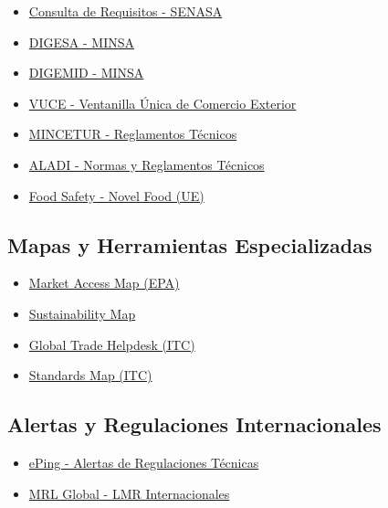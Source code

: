 \documentclass[
  jou,
  floatsintext,
  longtable,
  a4paper,
  nolmodern,
  notxfonts,
  notimes,
  colorlinks=true,linkcolor=blue,citecolor=blue,urlcolor=blue]{apa7}
\providecommand{\tightlist}{%
  \setlength{\itemsep}{0pt}\setlength{\parskip}{0pt}}
\begin{document}
\begin{itemize}
\tightlist
\item
  \href{https://servicios.senasa.gob.pe/consultaRequisitos/consultarRequisitos.action}{Consulta
  de Requisitos - SENASA}
\item
  \href{http://www.digesa.minsa.gob.pe/}{DIGESA - MINSA}
\item
  \href{https://www.digemid.minsa.gob.pe/webDigemid/}{DIGEMID - MINSA}
\item
  \href{https://www.vuce.gob.pe/Paginas/Inicio.aspx}{VUCE - Ventanilla
  Única de Comercio Exterior}
\item
  \href{https://www.mincetur.gob.pe/reglamentostecnicos/}{MINCETUR -
  Reglamentos Técnicos}
\item
  \href{https://www.aladi.org/sitioaladi/normas-y-reglamentos-tecnicos/}{ALADI
  - Normas y Reglamentos Técnicos}
\item
  \href{https://food.ec.europa.eu/food-safety/novel-food_en}{Food Safety
  - Novel Food (UE)}
\end{itemize}

\subsection{Mapas y Herramientas
Especializadas}\label{mapas-y-herramientas-especializadas}

\begin{itemize}
\tightlist
\item
  \href{https://m.macmap.org/es/learn/epa}{Market Access Map (EPA)}
\item
  \href{https://www.sustainabilitymap.org/home}{Sustainability Map}
\item
  \href{https://globaltradehelpdesk.org/es}{Global Trade Helpdesk (ITC)}
\item
  \href{https://www.standardsmap.org/es/home}{Standards Map (ITC)}
\end{itemize}

\subsection{Alertas y Regulaciones
Internacionales}\label{alertas-y-regulaciones-internacionales}

\begin{itemize}
\tightlist
\item
  \href{https://epingalert.org/}{ePing - Alertas de Regulaciones
  Técnicas}
\item
  \href{https://www.mrlglobal.com/}{MRL Global - LMR Internacionales}
\end{itemize}
\end{document}
